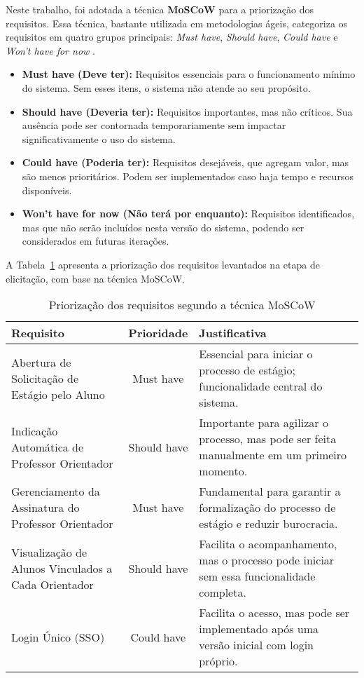 Neste trabalho, foi adotada a técnica \textbf{MoSCoW} para a priorização dos requisitos. Essa técnica, bastante utilizada em metodologias ágeis, categoriza os requisitos em quatro grupos principais: \textit{Must have}, \textit{Should have}, \textit{Could have} e \textit{Won’t have for now} \cite{clegg1994moscow, wiegers2013software}.

\begin{itemize}
    \item \textbf{Must have (Deve ter):} Requisitos essenciais para o funcionamento mínimo do sistema. Sem esses itens, o sistema não atende ao seu propósito.
    \item \textbf{Should have (Deveria ter):} Requisitos importantes, mas não críticos. Sua ausência pode ser contornada temporariamente sem impactar significativamente o uso do sistema.
    \item \textbf{Could have (Poderia ter):} Requisitos desejáveis, que agregam valor, mas são menos prioritários. Podem ser implementados caso haja tempo e recursos disponíveis.
    \item \textbf{Won’t have for now (Não terá por enquanto):} Requisitos identificados, mas que não serão incluídos nesta versão do sistema, podendo ser considerados em futuras iterações.
\end{itemize}

A Tabela~\ref{tab:priorizacao} apresenta a priorização dos requisitos levantados na etapa de elicitação, com base na técnica MoSCoW.

\begin{table}[H]
\centering
\caption{Priorização dos requisitos segundo a técnica MoSCoW}
\label{tab:priorizacao}
\begin{tabular}{|p{6cm}|c|p{6cm}|}
\hline
\textbf{Requisito} & \textbf{Prioridade} & \textbf{Justificativa} \\
\hline
Abertura de Solicitação de Estágio pelo Aluno & Must have & Essencial para iniciar o processo de estágio; funcionalidade central do sistema. \\
\hline
Indicação Automática de Professor Orientador & Should have & Importante para agilizar o processo, mas pode ser feita manualmente em um primeiro momento. \\
\hline
Gerenciamento da Assinatura do Professor Orientador & Must have & Fundamental para garantir a formalização do processo de estágio e reduzir burocracia. \\
\hline
Visualização de Alunos Vinculados a Cada Orientador & Should have & Facilita o acompanhamento, mas o processo pode iniciar sem essa funcionalidade completa. \\
\hline
Login Único (SSO) & Could have & Facilita o acesso, mas pode ser implementado após uma versão inicial com login próprio. \\
\hline
\end{tabular}
\end{table}


